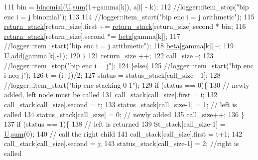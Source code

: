 \begin{DoxyCode}
111         bin = \hyperlink{compression__helper_8cpp_acecca9cb279d3b3d82915a07d67818cf}{binomial}(\hyperlink{classb__graph__encoder_ac810138443002a2b2cf579ced2dc34ce}{U}.\hyperlink{classreverse__fenwick__tree_a672731fd6395b4853430073a099a80e6}{sum}(1+gamma[k]), a[i] - k);
112         \textcolor{comment}{//logger::item\_stop("bip enc i = j binomial");}
113 
114         \textcolor{comment}{//logger::item\_start("bip enc i = j arithmetic");}
115         \hyperlink{namespacehelper__vars_a6d2100c373830cacd232319a9958652d}{return\_stack}[return\_size].first += \hyperlink{namespacehelper__vars_a6d2100c373830cacd232319a9958652d}{return\_stack}[return\_size].second * bin;
116         \hyperlink{namespacehelper__vars_a6d2100c373830cacd232319a9958652d}{return\_stack}[return\_size].second *= \hyperlink{classb__graph__encoder_ae54d76cc4cee399d98951f870897a144}{beta}[gamma[k]];
117         \textcolor{comment}{//logger::item\_start("bip enc i = j arithmetic");}
118         \hyperlink{classb__graph__encoder_ae54d76cc4cee399d98951f870897a144}{beta}[gamma[k]] --;
119         \hyperlink{classb__graph__encoder_ac810138443002a2b2cf579ced2dc34ce}{U}.\hyperlink{classreverse__fenwick__tree_a942d7f49b37e53ebfec3076d177691d7}{add}(gamma[k],-1);
120       \}
121       return\_size ++;
122       call\_size --;
123       \textcolor{comment}{//logger::item\_stop("bip enc i = j");}
124     \}\textcolor{keywordflow}{else}\{
125       \textcolor{comment}{//logger::item\_start("bip enc i neq j");}
126       t = (i+j)/2;
127       status = status\_stack[call\_size - 1];
128       \textcolor{comment}{//logger::item\_start("bip enc stacking 0 1");}
129       \textcolor{keywordflow}{if} (status == 0)\{
130         \textcolor{comment}{// newly added, left node must be called}
131         call\_stack[call\_size].first = i;
132         call\_stack[call\_size].second = t;
133         status\_stack[call\_size-1] = 1; \textcolor{comment}{// left is called}
134         status\_stack[call\_size] = 0; \textcolor{comment}{// newly added}
135         call\_size++;
136       \}
137       \textcolor{keywordflow}{if} (status == 1)\{
138         \textcolor{comment}{// left is returned}
139         St\_stack[call\_size-1] = \hyperlink{classb__graph__encoder_ac810138443002a2b2cf579ced2dc34ce}{U}.\hyperlink{classreverse__fenwick__tree_a672731fd6395b4853430073a099a80e6}{sum}(0);
140         \textcolor{comment}{// call the right child}
141         call\_stack[call\_size].first = t+1;
142         call\_stack[call\_size].second = j;
143         status\_stack[call\_size-1] = 2; \textcolor{comment}{//right is called}

\end{DoxyCode}
